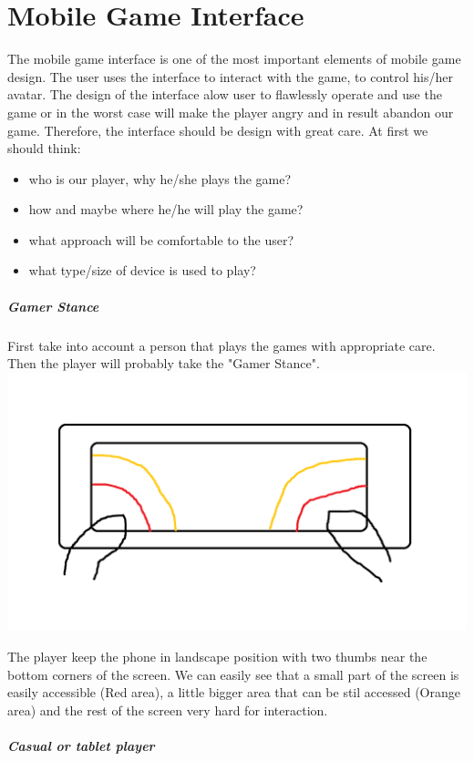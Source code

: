 \chapter{Mobile Game Interface}

The mobile game interface is one of the most important elements of mobile game design. The user uses the interface to interact with the game, to control his/her avatar. The design of the interface alow user to flawlessly operate and use the game or in the worst case will make the player angry and in result abandon our game. Therefore, the interface should be design with great care. At first we should think:
\begin{itemize}
\item who is our player, why he/she plays the game?
\item how and maybe where he/he will play the game?
\item what approach will be comfortable to the user?
\item what type/size of device is used to play?
\end{itemize}

\paragraph*{Gamer Stance}
First take into account a person that plays the games with appropriate care. Then the player will probably take the "Gamer Stance".
\includegraphics[width=.8\textwidth]{chapters/img/gamerStance.png}

The player keep the phone in landscape position with two thumbs near the bottom corners of the screen. We can easily see that a small part of the screen is easily accessible (Red area), a little bigger area that can be stil accessed (Orange area) and the rest of the screen very hard for interaction.

\paragraph*{Casual or tablet player}

